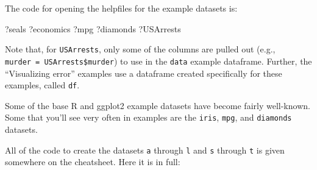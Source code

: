 \documentclass[]{book}
\makeatletter
\newenvironment{Shaded}{\begin{snugshade}}{\end{snugshade}}
\newcommand{\NormalTok}[1]{#1}
\newenvironment{kframe}{%
\medskip{}
\setlength{\fboxsep}{.8em}
 \def\at@end@of@kframe{}%
 \ifinner\ifhmode%
  \def\at@end@of@kframe{\end{minipage}}%
  \begin{minipage}{\columnwidth}%
 \fi\fi%
 \def\FrameCommand##1{\hskip\@totalleftmargin \hskip-\fboxsep
 \colorbox{shadecolor}{##1}\hskip-\fboxsep
     \hskip-\linewidth \hskip-\@totalleftmargin \hskip\columnwidth}%
 \MakeFramed {\advance\hsize-\width
   \@totalleftmargin\z@ \linewidth\hsize
   \@setminipage}}%
 {\par\unskip\endMakeFramed%
 \at@end@of@kframe}
\renewenvironment{Shaded}{\begin{kframe}}{\end{kframe}}
\newenvironment{rmdblock}[1]
  {
  \begin{itemize}
  \renewcommand{\labelitemi}{
    \raisebox{-.7\height}[0pt][0pt]{
      {\setkeys{Gin}{width=3em,keepaspectratio}\texttt{[image: images/\#1]}}
    }
  }
  \setlength{\fboxsep}{1em}
  \begin{kframe}
  \item
  }
  {
  \end{kframe}
  \end{itemize}
  }
\newenvironment{rmdnote}
  {\begin{rmdblock}{note}}
  {\end{rmdblock}}
\theoremstyle{definition}
\theoremstyle{definition}
\theoremstyle{definition}
\theoremstyle{remark}
\makeatother
\begin{document}
The code for opening the helpfiles for the example datasets is:

\begin{Shaded}
\begin{Highlighting}[]
\NormalTok{?seals}
\NormalTok{?economics}
\NormalTok{?mpg}
\NormalTok{?diamonds}
\NormalTok{?USArrests}
\end{Highlighting}
\end{Shaded}

Note that, for \texttt{USArrests}, only some of the columns are pulled
out (e.g., \texttt{murder\ =\ USArrests\$murder}) to use in the
\texttt{data} example dataframe. Further, the ``Visualizing error''
examples use a dataframe created specifically for these examples, called
\texttt{df}.

\begin{rmdnote}
Some of the base R and ggplot2 example datasets have become fairly
well-known. Some that you'll see very often in examples are the
\texttt{iris}, \texttt{mpg}, and \texttt{diamonds} datasets.
\end{rmdnote}

All of the code to create the datasets \texttt{a} through \texttt{l} and
\texttt{s} through \texttt{t} is given somewhere on the cheatsheet. Here
it is in full:
\end{document}
